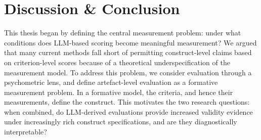\newpage
\section{Discussion \& Conclusion}



This thesis began by defining the central measurement problem: under what conditions does LLM-based scoring become meaningful measurement? We argued that many current methods fall short of permitting construct-level claims based on criterion-level scores because of a theoretical underspecification of the measurement model. To address this problem, we consider evaluation through a psychometric lens, and define artefact-level evaluation as a formative measurement problem. In a formative model, the criteria, and hence their measurements, define the construct. This motivates the two research questions: when combined, do LLM-derived evaluations provide increased validity evidence under increasingly rich construct specifications, and are they diagnostically interpretable?

